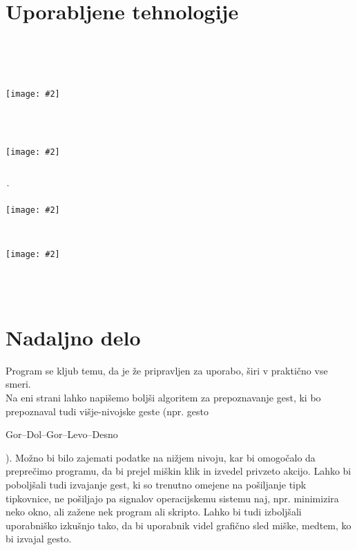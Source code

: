 \documentclass[10pt,a4paper,oneside]{book}
\newcommand\inline[1]{%
\begin{Sbox}{#1}\end{Sbox}%
\colorbox{lightgray}{\TheSbox}%
}
\newcommand\pic[2]{%
\parbox{1cm}{%
\begin{center}%
\texttt{[image: \#2]}%
\end{center}%
}%
}
\newcommand\br{%
 \ \\ \ \\%
}
\begin{document}
\chapter{Uporabljene tehnologije}
\br\ \\[0.5cm]
\pic{0.5}{./logoPython.png}\ \ \ \ \ \ \ \ \ \ \ \ \ \ \ \ \ \ \ \ \ \ \ \ \ \ \ \ \ \ \ \ \ \ \ \ \ \ \ \ \ \ \ \ \ \ \ \ \ \ \ \ \ \ \ \ \ \ \ \ \ \ \ \ \ \ \ \ \ \ \ \ \ \ \ \ \ \ \ \ \ \ \ \ \ \ \ \ \ \ 
\pic{0.2}{./logoGTK.jpg}\\[3cm]
\. \ \ \ \ \ \ \ \ \ \ \ \ \ \ \ \ \ \ \ \ \ \ \ \ \pic{0.25}{./logoX.png}\ \ \ \ \ \ \ \ \ \ \ \ \ \ \ \ \ \ \ \ \ \ \ \ \ \ \ \ \ \ \ \ \ \ \ \ \ \ \ \ \ \ \ \ \ \ \ \ \ \ \ \ \ 
\pic{0.15}{./logoAppindicator.png}
\br



\chapter{Nadaljno delo}
Program se kljub temu, da je že pripravljen za uporabo, širi v praktično vse smeri.\\
Na eni strani lahko napišemo boljši algoritem za prepoznavanje gest, ki bo prepoznaval tudi višje-nivojske geste (npr. gesto \inline{Gor--Dol--Gor--Levo--Desno}). Možno bi bilo zajemati podatke na nižjem nivoju, kar bi omogočalo da preprečimo programu, da bi prejel miškin klik in izvedel privzeto akcijo. Lahko bi poboljšali tudi izvajanje gest, ki so trenutno omejene na pošiljanje tipk tipkovnice, ne pošiljajo pa signalov operacijskemu sistemu naj, npr. minimizira neko okno, ali zažene nek program ali skripto. Lahko bi tudi izboljšali uporabniško izkušnjo tako, da bi uporabnik videl grafično sled miške, medtem, ko bi izvajal gesto.
\end{document}
